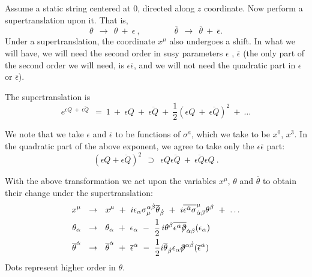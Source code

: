\documentclass[12pt]{article}
\newcommand{\p}{\partial}
\newcommand{\ov}{\overline}
\def\slashed#1{\setbox0=\hbox{$#1$}             %
   \dimen0=\wd0                                 %
   \setbox1=\hbox{/} \dimen1=\wd1               %
   \ifdim\dimen0>\dimen1                        %
      \rlap{\hbox to \dimen0{\hfil/\hfil}}      %
      #1                                        %
   \else                                        %
      \rlap{\hbox to \dimen1{\hfil$#1$\hfil}}   %
      /                                         %
   \fi}                                        %
\begin{document}
   Assume a static string centered at 0, directed along $ z $ coordinate.
Now perform a supertranslation upon it. That is, 
\[
	\theta ~~\to~~ \theta ~+~ \epsilon~,\qquad\qquad \ov{\theta} ~~\to~~ \ov{\theta} ~+~ \ov{\epsilon}.
\]
Under a supertranslation, the coordinate $ x^\mu $ also undergoes a shift.
In what we will have, we will need the second order in susy parameters  $ \epsilon $ , $\ov{\epsilon}$
(the only part of the second order we will need, is $ \epsilon\ov{\epsilon}$, and we will not need
the quadratic part in $ \epsilon $ or $\ov{\epsilon}$).

The supertranslation is
\[
	e^{\epsilon Q ~+~ \ov{\epsilon Q}}  ~~=~  1 ~+~ \epsilon Q ~+~ \ov{\epsilon Q} ~+~
		\frac{1}{2} ( \epsilon Q ~+~ \ov{\epsilon Q} )^2 ~+~ \dots
\]

We note that we take $ \epsilon $ and $\ov{\epsilon} $ to be functions of $ \sigma^{a} $, which we take
to be $ x^0 $, $ x^3 $.
In the quadratic part of the above exponent, we agree to take only the $ \epsilon\ov{\epsilon} $ part:
\[
	( \epsilon Q + \ov{\epsilon Q} )^2 ~~\supset~~ \epsilon Q \ov{\epsilon Q} ~+~ 
						\ov{\epsilon Q} \epsilon Q~.
\]

With the above transformation we act upon the variables $ x^\mu $, $ \theta $ and $\ov{\theta} $
to obtain their change under the supertranslation:
\begin{align*}
	x^\mu & ~~\to~~ x^\mu ~+~ i \epsilon_\alpha\sigma_\mu^{\alpha\dot{\beta}}\ov{\theta}_{\dot{\beta}} ~+~
		i\ov{\epsilon^{\dot{\alpha}} \sigma}^\mu_{\dot{\alpha}\beta} \theta^\beta ~+~ \dots  
\\
	\theta_\alpha & ~~\to~~ \theta_\alpha ~+~ \epsilon_\alpha ~-~ 
			\frac{1}{2}\,i \theta^\beta\ov{\epsilon^{\dot{\alpha}}\slashed{\p}}_{\dot{\alpha}\beta}(\epsilon_\alpha)
\\
	\ov{\theta}^{\dot{\alpha}} & ~~\to~~ \ov{\theta}^{\dot{\alpha}} ~+~
		\ov{\epsilon}^{\dot{\alpha}} ~-~
		\frac{1}{2} i \ov{\theta}_{\dot{\beta}} \epsilon_\alpha \slashed{\p}^{\alpha\dot{\beta}}
								(\ov{\epsilon}^{\dot{\alpha}})
\end{align*}
Dots represent higher order in $ \theta $.
\end{document}
